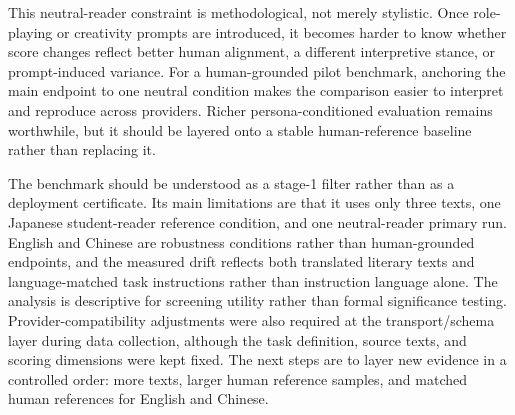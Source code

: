 This neutral-reader constraint is methodological, not merely stylistic. Once role-playing or creativity prompts are introduced, it becomes harder to know whether score changes reflect better human alignment, a different interpretive stance, or prompt-induced variance. For a human-grounded pilot benchmark, anchoring the main endpoint to one neutral condition makes the comparison easier to interpret and reproduce across providers. Richer persona-conditioned evaluation remains worthwhile, but it should be layered onto a stable human-reference baseline rather than replacing it.

The benchmark should be understood as a stage-1 filter rather than as a deployment certificate. Its main limitations are that it uses only three texts, one Japanese student-reader reference condition, and one neutral-reader primary run. English and Chinese are robustness conditions rather than human-grounded endpoints, and the measured drift reflects both translated literary texts and language-matched task instructions rather than instruction language alone. The analysis is descriptive for screening utility rather than formal significance testing. Provider-compatibility adjustments were also required at the transport/schema layer during data collection, although the task definition, source texts, and scoring dimensions were kept fixed. The next steps are to layer new evidence in a controlled order: more texts, larger human reference samples, and matched human references for English and Chinese.
